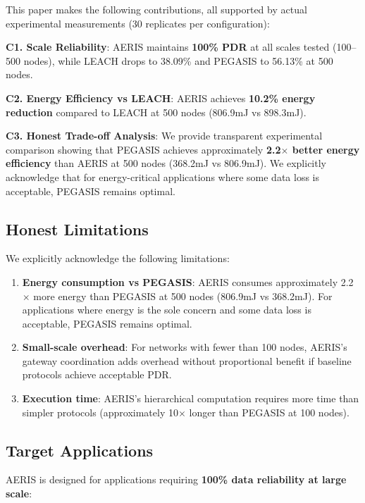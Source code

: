 \documentclass[twocolumn]{article}
\begin{document}
This paper makes the following contributions, all supported by actual
experimental measurements (30 replicates per configuration):

\textbf{C1. Scale Reliability}: AERIS maintains \textbf{100\% PDR} at all
scales tested (100--500 nodes), while LEACH drops to 38.09\% and PEGASIS
to 56.13\% at 500 nodes.

\textbf{C2. Energy Efficiency vs LEACH}: AERIS achieves \textbf{10.2\% energy
reduction} compared to LEACH at 500 nodes (806.9mJ vs 898.3mJ).

\textbf{C3. Honest Trade-off Analysis}: We provide transparent experimental
comparison showing that PEGASIS achieves approximately \textbf{2.2$\times$ better
energy efficiency} than AERIS at 500 nodes (368.2mJ vs 806.9mJ). We explicitly
acknowledge that for energy-critical applications where some data loss is
acceptable, PEGASIS remains optimal.

\subsection{Honest Limitations}

We explicitly acknowledge the following limitations:

\begin{enumerate}
    \item \textbf{Energy consumption vs PEGASIS}: AERIS consumes approximately
    2.2$\times$ more energy than PEGASIS at 500 nodes (806.9mJ vs 368.2mJ).
    For applications where energy is the sole concern and some data loss is
    acceptable, PEGASIS remains optimal.

    \item \textbf{Small-scale overhead}: For networks with fewer than 100
    nodes, AERIS's gateway coordination adds overhead without proportional
    benefit if baseline protocols achieve acceptable PDR.

    \item \textbf{Execution time}: AERIS's hierarchical computation requires
    more time than simpler protocols (approximately 10$\times$ longer than
    PEGASIS at 100 nodes).
\end{enumerate}

\subsection{Target Applications}

AERIS is designed for applications requiring \textbf{100\% data reliability
at large scale}:
\end{document}
